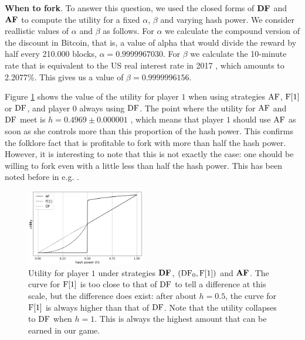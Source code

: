 \medskip
\noindent
\textbf{When to fork}. To answer this question, we used the closed forms of $\text{\rm {\bf DF}}$ and $\text{\rm {\bf AF}}$ to compute the utility for a fixed $\alpha$, $\beta$ and varying hash power. 
We consider reallistic values of $\alpha$ and $\beta$ as follows. For $\alpha$ we calculate the compound version of the discount in Bitcoin, that is, 
a value of alpha that would divide the reward by half every 210.000 blocks, \ie $\alpha = 0.9999967030$. For 
$\beta$ we calculate the 10-minute rate that is equivalent to the US real interest rate in 2017 \cite{interest}, which amounts to 2.2077\%. This gives us a value of $\beta = 0.9999996156$. 

Figure \ref{fig-af-df-fo} shows the value of the utility for player $1$ when using strategies $\text{\rm AF}$, $\text{\rm F[{1}]}$ or $\text{\rm DF}$, and player $0$ always using $\text{\rm DF}$. The point where the utility for 
$\text{\rm AF}$ and $\text{\rm DF}$ meet is $h = 0.4969 \pm 0.000001$ , which means that player $1$ should use $\text{\rm AF}$ as soon as she controls more than this proportion of the hash power. This confirms the 
folklore fact that is profitable to fork with more than half the hash power. However, it is interesting to note that this is not exactly the case: one should be willing to fork even with a little less than half the hash power. This has been noted before in e.g. \cite{}. 

\begin{figure}
  \centering
    \includegraphics[width=0.46\textwidth]{plots/test_AF.png}
    \caption{Utility for player $1$ under strategies $\text{\rm {\bf DF}}$, $(\text{\rm DF}_0,\text{\rm F[{1}]})$ and $\text{\rm {\bf AF}}$. The curve for $\text{\rm F[{1}]}$ is too close to that of $\text{\rm DF}$ to tell a difference at this scale, but the difference does exist: after about $h = 0.5$, the curve for $\text{\rm F[{1}]}$ is always higher than that of $\text{\rm DF}$. Note that the utility collapses to $\text{\rm DF}$ when $h = 1$. This is always the highest amount that can be earned in our game.}
        \label{fig-af-df-fo}
\end{figure}


